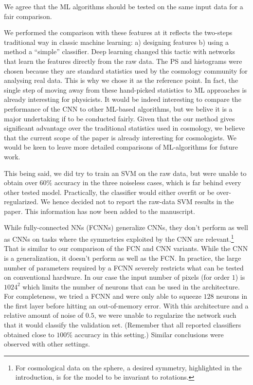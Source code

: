 \documentclass[12pt,a4paper]{article}
\newcommand{\nati}[1]{{\color[rgb]{.1,.6,.1}{NP: #1}}}
\newcommand{\1}{\b{1}}              %
\newcommand{\0}{\b{0}}              %
\begin{document}
We agree that the ML algorithms should be tested on the same input data for a fair comparison.

We performed the comparison with these features at it reflects the two-steps traditional way in classic machine learning: a) designing features b) using a method a ``simple'' classifier. Deep learning changed this tactic with networks that learn the features directly from the raw data.
The PS and histograms were chosen because they are standard statistics used by the cosmology community for analysing real data.
This is why we chose it as the reference point.
In fact, the single step of moving away from these hand-picked statistics to ML approaches is already interesting for physicists.
It would be indeed interesting to compare the performance of the CNN to other ML-based algorithms, but we belive it is a major undertaking if to be conducted fairly.
Given that the our method gives significant advantage over the traditional statistics used in cosmology, we believe that the current scope of the paper is already interesting for cosmologists.
We would be keen to leave more detailed comparisons of ML-algorithms for future work.


This being said, we did try to train an SVM on the raw data, but were unable to obtain over $60\%$ accuracy in the three noiseless cases, which is far behind every other tested model.
Practically, the classifier would either overfit or be over-regularized.
We hence decided not to report the raw-data SVM results in the paper.
This information has now been added to the manuscript.

While fully-connected NNs (FCNNs) generalize CNNs, they don't perform as well as CNNs on tasks where the symmetries exploited by the CNN are relevant.\footnote{For cosmological data on the sphere, a desired symmetry, highlighted in the introduction, is for the model to be invariant to rotations.}
That is similar to our comparison of the FCN and CNN variants.
While the CNN is a generalization, it doesn't perform as well as the FCN.
In practice, the large number of parameters required by a FCNN severely restricts what can be tested on conventional hardware. In our case the input number of pixels (for order $1$) is $1024^2$ which limits the number of neurons that can be used in the architecture. For completeness, we tried a FCNN and were only able to squeeze $128$ neurons in the first layer before hitting an out-of-memory error. With this architecture and a relative amount of noise of $0.5$, we were unable to regularize the network such that it would classify the validation set. (Remember that all reported classifiers obtained close to $100\%$ accuracy in this setting.) Similar conclusions were observed with other settings.
\end{document}
